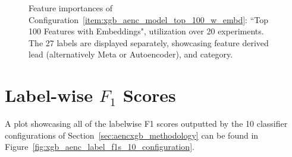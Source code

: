 \documentclass[\main/thesis.tex]{subfiles}
\begin{document}
\begin{appendices}
\begin{figure}[t]
    \centering
    \caption{Feature importances of Configuration~\ref{item:xgb_aenc_model_top_100_w_embd}: ``Top 100 Features with Embeddings", utilization over 20 experiments. The 27 labels are displayed separately, showcasing feature derived lead (alternatively Meta or Autoencoder), and category.}
    \label{fig:xgb_aenc_top_100_features_labelwise}
\end{figure}

\section{Label-wise $F_1$ Scores}

A plot showcasing all of the labelwise F1 scores outputted by the 10 classifier configurations of Section~\ref{sec:aencxgb_methodology} can be found in Figure~\ref{fig:xgb_aenc_label_f1s_10_configuration}.


\end{appendices}
\end{document}
